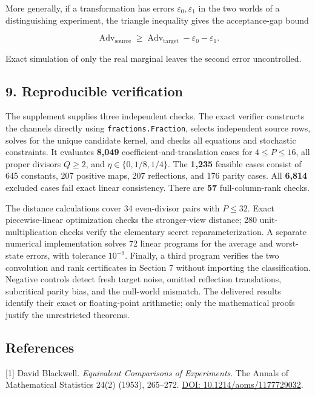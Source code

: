 \documentclass[
]{article}
\begin{document}
More generally, if a transformation has errors
\(\varepsilon_0,\varepsilon_1\) in the two worlds of a distinguishing
experiment, the triangle inequality gives the acceptance-gap bound

\[
\operatorname{Adv}_{\mathrm{source}}\ge
\operatorname{Adv}_{\mathrm{target}}-\varepsilon_0-\varepsilon_1.
\tag{10}
\]

Exact simulation of only the real marginal leaves the second error
uncontrolled.

\subsection{9. Reproducible
verification}\label{reproducible-verification}

The supplement supplies three independent checks. The exact verifier
constructs the channels directly using \texttt{fractions.Fraction},
selects independent source rows, solves for the unique candidate kernel,
and checks all equations and stochastic constraints. It evaluates
\textbf{8,049} coefficient-and-translation cases for \(4\le P\le16\),
all proper divisors \(Q\ge2\), and \(\eta\in\{0,1/8,1/4\}\). The
\textbf{1,235} feasible cases consist of 645 constants, 207 positive
maps, 207 reflections, and 176 parity cases. All \textbf{6,814} excluded
cases fail exact linear consistency. There are \textbf{57}
full-column-rank checks.

The distance calculations cover 34 even-divisor pairs with \(P\le32\).
Exact piecewise-linear optimization checks the stronger-view distance;
280 unit-multiplication checks verify the elementary secret
reparameterization. A separate numerical implementation solves 72 linear
programs for the average and worst-state errors, with tolerance
\(10^{-9}\). Finally, a third program verifies the two convolution and
rank certificates in Section 7 without importing the classification.
Negative controls detect fresh target noise, omitted reflection
translations, subcritical parity bias, and the null-world mismatch. The
delivered results identify their exact or floating-point arithmetic;
only the mathematical proofs justify the unrestricted theorems.

\subsection{References}\label{references}

{[}1{]} David Blackwell. \emph{Equivalent Comparisons of Experiments}.
The Annals of Mathematical Statistics 24(2) (1953), 265--272.
\href{https://doi.org/10.1214/aoms/1177729032}{DOI:
10.1214/aoms/1177729032}.
\end{document}
